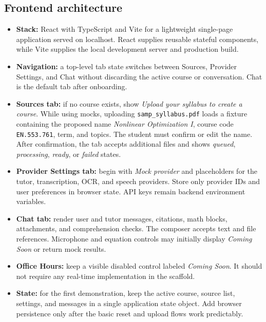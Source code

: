 \documentclass[11pt]{article}
\begin{document}
\subsection{Frontend architecture}
\begin{itemize}
\item \textbf{Stack:} React with TypeScript and Vite for a lightweight single-page application served on localhost. React supplies reusable stateful components, while Vite supplies the local development server and production build.\cite{react,vite}
\item \textbf{Navigation:} a top-level tab state switches between Sources, Provider Settings, and Chat without discarding the active course or conversation. Chat is the default tab after onboarding.
\item \textbf{Sources tab:} if no course exists, show \emph{Upload your syllabus to create a course}. While using mocks, uploading \texttt{samp\_syllabus.pdf} loads a fixture containing the proposed name \emph{Nonlinear Optimization I}, course code \texttt{EN.553.761}, term, and topics. The student must confirm or edit the name. After confirmation, the tab accepts additional files and shows \emph{queued}, \emph{processing}, \emph{ready}, or \emph{failed} states.
\item \textbf{Provider Settings tab:} begin with \emph{Mock provider} and placeholders for the tutor, transcription, OCR, and speech providers. Store only provider IDs and user preferences in browser state. API keys remain backend environment variables.
\item \textbf{Chat tab:} render user and tutor messages, citations, math blocks, attachments, and comprehension checks. The composer accepts text and file references. Microphone and equation controls may initially display \emph{Coming Soon} or return mock results.
\item \textbf{Office Hours:} keep a visible disabled control labeled \emph{Coming Soon}. It should not require any real-time implementation in the scaffold.
\item \textbf{State:} for the first demonstration, keep the active course, source list, settings, and messages in a single application state object. Add browser persistence only after the basic reset and upload flows work predictably.
\end{itemize}
\end{document}
